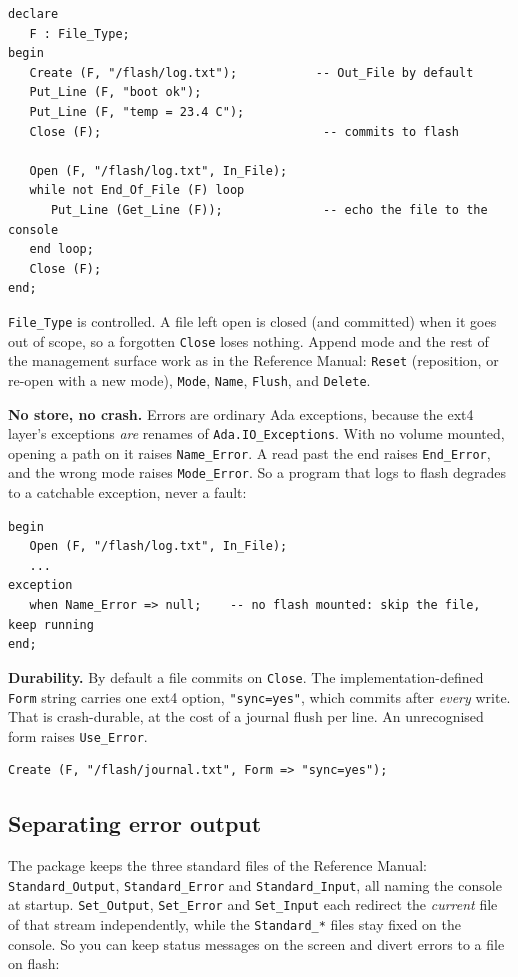 \begin{lstlisting}
declare
   F : File_Type;
begin
   Create (F, "/flash/log.txt");           -- Out_File by default
   Put_Line (F, "boot ok");
   Put_Line (F, "temp = 23.4 C");
   Close (F);                               -- commits to flash

   Open (F, "/flash/log.txt", In_File);
   while not End_Of_File (F) loop
      Put_Line (Get_Line (F));              -- echo the file to the console
   end loop;
   Close (F);
end;
\end{lstlisting}

\texttt{File\_Type} is controlled. A file left open is closed (and committed) when
it goes out of scope, so a forgotten \texttt{Close} loses nothing. Append mode and
the rest of the management surface work as in the Reference Manual: \texttt{Reset}
(reposition, or re-open with a new mode), \texttt{Mode}, \texttt{Name},
\texttt{Flush}, and \texttt{Delete}.

\textbf{No store, no crash.} Errors are ordinary Ada exceptions, because the ext4
layer's exceptions \emph{are} renames of \texttt{Ada.IO\_Exceptions}. With no
volume mounted, opening a path on it raises \texttt{Name\_Error}. A read past the
end raises \texttt{End\_Error}, and the wrong mode raises \texttt{Mode\_Error}. So
a program that logs to flash degrades to a catchable exception, never a fault:

\begin{lstlisting}
begin
   Open (F, "/flash/log.txt", In_File);
   ...
exception
   when Name_Error => null;    -- no flash mounted: skip the file, keep running
end;
\end{lstlisting}

\textbf{Durability.} By default a file commits on \texttt{Close}. The
implementation-defined \texttt{Form} string carries one ext4 option,
\texttt{"sync=yes"}, which commits after \emph{every} write. That is crash-durable,
at the cost of a journal flush per line. An unrecognised form raises
\texttt{Use\_Error}.

\begin{lstlisting}
Create (F, "/flash/journal.txt", Form => "sync=yes");
\end{lstlisting}

\subsection{Separating error output}

The package keeps the three standard files of the Reference Manual:
\texttt{Standard\_Output}, \texttt{Standard\_Error} and \texttt{Standard\_Input},
all naming the console at startup. \texttt{Set\_Output}, \texttt{Set\_Error} and
\texttt{Set\_Input} each redirect the \emph{current} file of that stream
independently, while the \texttt{Standard\_*} files stay fixed on the console. So
you can keep status messages on the screen and divert errors to a file on flash:

